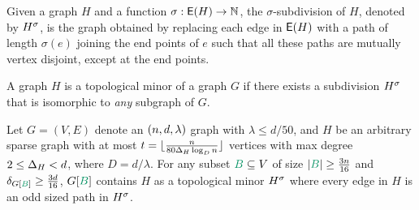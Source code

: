 \documentclass[11pt]{article}
\begin{document}
\begin{definition}\label{def:subdivisions}
Given a graph $H$ and a function $\sigma: \mathsf{E}(H) \rightarrow \mathbb{N}$, the $\sigma$-subdivision of $H$, denoted by ${H}^{\sigma}$, is the graph obtained by replacing each edge in $\mathsf{E}(H)$ with a path of length $\sigma(e)$ joining the end points of $e$ such that all these paths are mutually vertex disjoint, except at the end points.	
\end{definition}

\begin{definition}\label{def:topological-minor}
A graph $H$ is a topological minor of a graph $G$ if there exists a subdivision ${H}^{\sigma}$ that is isomorphic to \emph{any} subgraph of $G$.	
\end{definition}


\begin{theorem}\label{theorem:embedding-theorem}
  Let $G=(V,E)$ denote an $(n, d, \lambda)$ graph with $\lambda \le d/50$, and $H$ be an arbitrary sparse graph with at most $t = \lfloor \frac{ n}{80\Delta_{H}\log_Dn}\rfloor $ vertices with max degree $ 2 \le \Delta_{H} < d$, where $D=d/\lambda$.
  For any subset $\GreenB \subseteq V$ of size $\Size{\GreenB} \ge \frac{3n}{16}$ and $\MinimalDegree{G[\GreenB]} \ge \frac{3d}{16}$, $G[\GreenB]$ contains $H$ as a topological minor ${H}^{\sigma}$ where every edge in $H$ is an odd sized path in ${H}^{\sigma}$.
\end{theorem}
\end{document}
